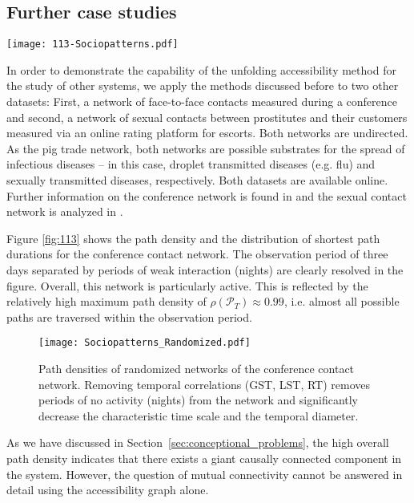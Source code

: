 \subsection{Further case studies}
%
\begin{SCfigure}
\texttt{[image: 113-Sociopatterns.pdf]}
\caption{Unfolding accessibility of a conference contact network.
The fast saturation behavior and the high maximum of the path density suggest a high degree of mixing in this system.}
\label{fig:113}
\end{SCfigure}
%
In order to demonstrate the capability of the unfolding accessibility method for the study of other systems, we apply the methods discussed before to two other datasets:
First, a network of face-to-face contacts measured during a conference and second, a network of sexual contacts between prostitutes and their customers measured via an online rating platform for escorts.
Both networks are undirected.
As the pig trade network, both networks are possible substrates for the spread of infectious diseases -- in this case, droplet transmitted diseases (e.g. flu) and sexually transmitted diseases, respectively.
Both datasets are available online.
Further information on the conference network is found in \citep{isella2011,sociopatterns.org} and the sexual contact network is analyzed in \citep{Rocha_pnas}.

Figure \ref{fig:113} shows the path density and the distribution of shortest path durations for the conference contact network.
The observation period of three days separated by periods of weak interaction (nights) are clearly resolved in the figure.
Overall, this network is particularly active.
This is reflected by the relatively high maximum path density of $\rho (\mathcal{P}_T) \approx 0.99$, i.e. almost all possible paths are traversed within the observation period.
%
\begin{figure}[h!]
\begin{center}
\texttt{[image: Sociopatterns\_Randomized.pdf]}
\caption{Path densities of randomized networks of the conference contact network.
Removing temporal correlations (GST, LST, RT) removes periods of no activity (nights) from the network and significantly decrease the characteristic time scale and the temporal diameter.}
\label{fig:113_random}
\end{center}
\end{figure}
%
As we have discussed in Section~\ref{sec:conceptional_problems}, the high overall path density indicates that there exists a giant causally connected component in the system.
However, the question of mutual connectivity cannot be answered in detail using the accessibility graph alone.


